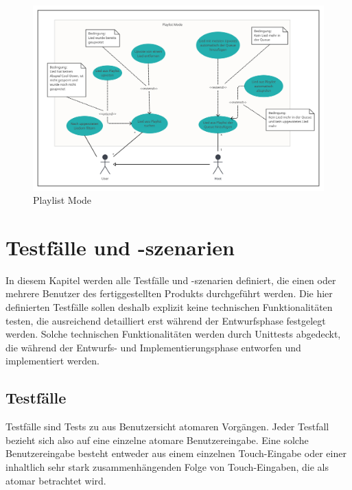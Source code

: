 \documentclass[oneside, ngerman]{sdqtechreport}
\begin{document}
\begin{figure}[h]
    \includegraphics[width = 18cm]{LATEX/Pflichtenheft/GraphicDesigns/Use Case Playlist Mode.png}
    \caption{Playlist Mode}
    \label{fig:Use Case Playlist Mode}
\end{figure}


\chapter{Testfälle und -szenarien}
\label{chap:Tests}

In diesem Kapitel werden alle Testfälle und -szenarien definiert, die einen oder mehrere Benutzer des fertiggestellten Produkts durchgeführt werden. Die hier definierten Testfälle sollen deshalb explizit keine technischen Funktionalitäten testen, die ausreichend detailliert erst während der Entwurfsphase festgelegt werden. Solche technischen Funktionalitäten werden durch Unittests abgedeckt, die während der Entwurfs- und Implementierungsphase entworfen und implementiert werden.

\section{Testfälle}
\label{sec:Tests:Testfälle}

Testfälle sind Tests zu aus Benutzersicht atomaren Vorgängen. Jeder Testfall bezieht sich also auf eine einzelne atomare Benutzereingabe. Eine solche Benutzereingabe besteht entweder aus einem einzelnen Touch-Eingabe oder einer inhaltlich sehr stark zusammenhängenden Folge von Touch-Eingaben, die als atomar betrachtet wird.
\end{document}
